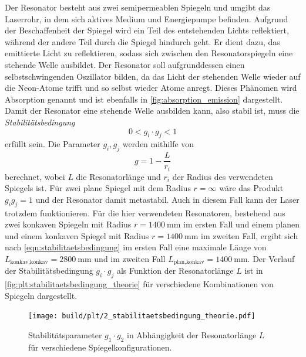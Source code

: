     Der Resonator besteht aus zwei semipermeablen Spiegeln und umgibt das Laserrohr,
    in dem sich aktives Medium und Energiepumpe befinden.
    Aufgrund der Beschaffenheit der Spiegel wird ein Teil des entstehenden Lichts reflektiert,
    während der andere Teil durch die Spiegel hindurch geht.
    Er dient dazu,
    das emittierte Licht zu reflektieren,
    sodass sich zwischen den Resonatorspiegeln eine stehende Welle ausbildet.
    Der Resonator soll aufgrunddessen einen selbstschwingenden Oszillator bilden,
    da das Licht der stehenden Welle wieder auf die Neon-Atome trifft und so selbst wieder Atome anregt.
    Dieses Phänomen wird Absorption genannt und ist ebenfalls in \autoref{fig:absorption_emission} dargestellt.\\
    Damit der Resonator eine stehende Welle ausbilden kann,
    also stabil ist,
    muss die \textit{Stabilitätsbedingung}
    \begin{equation}
        0 < g_i \cdot g_j < 1
        \label{eqn:stabilitaetsbedingung}
    \end{equation}
    erfüllt sein.
    Die Parameter $g_i, g_j$ werden mithilfe von
    \begin{equation}
        g = 1 - \frac{L}{r_i}
        \label{eqn:stabilitaetsparameter}
    \end{equation}
    berechnet,
    wobei $L$ die Resonatorlänge und $r_i$ der Radius des verwendeten Spiegels ist.
    Für zwei plane Spiegel mit dem Radius $r = \infty$ wäre das Produkt $g_ig_j = 1$ und der Resonator damit metastabil.
    Auch in diesem Fall kann der Laser trotzdem funktionieren.
    Für die hier verwendeten Resonatoren,
    bestehend aus zwei konkaven Spiegeln mit Radius $r = \SI{1400}{\milli\meter}$ im ersten Fall und einem planen und einem konkaven Spiegel mit Radius $r = \SI{1400}{\milli\meter}$ im zweiten Fall,
    ergibt sich nach \autoref{eqn:stabilitaetsbedingung} im ersten Fall eine maximale Länge von $L_\text{konkav,konkav} = \SI{2800}{\milli\meter}$ und im zweiten Fall $L_\text{plan,konkav} = \SI{1400}{\milli\meter}$.
    Der Verlauf der Stabilitätsbedingung $g_i \cdot g_j$ als Funktion der Resonatorlänge $L$ ist in \autoref{fig:plt:stabilitaetsbedingung_theorie} für verschiedene Kombinationen von Spiegeln dargestellt.
    \begin{figure}[H]
        \centering
        \texttt{[image: build/plt/2\_stabilitaetsbedingung\_theorie.pdf]}
        \caption{Stabilitätsparameter $g_1 \cdot g_2$ in Abhängigkeit der Resonatorlänge $L$ für verschiedene Spiegelkonfigurationen.}
        \label{fig:plt:stabilitaetsbedingung_theorie}
    \end{figure}


